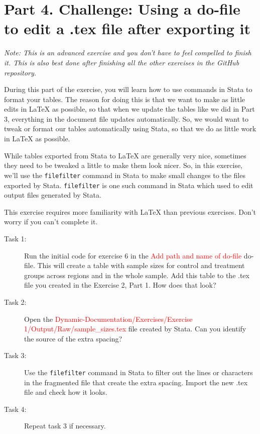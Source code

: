 \documentclass[12pts]{report}
\begin{document}
\section*{Part 4. Challenge: Using a do-file to edit a .tex file after exporting it}
\textit{Note: This is an advanced exercise and you don't have to feel compelled to finish it. This is also best done after finishing all the other exercises in the GitHub repository.}
 
During this part of the exercise, you will learn how to use commands in Stata to format your tables. The reason for doing this is that we want to make as little edits in {\LaTeX} as possible, so that when we update the tables like we did in Part 3, everything in the document file updates automatically. So, we would want to tweak or format our tables automatically using Stata, so that we do as little work in {\LaTeX} as possible.

While tables exported from Stata to {\LaTeX} are generally very nice, sometimes they need to be tweaked a little to make them look nicer. So, in this exercise, we'll use the \texttt{filefilter} command in Stata to make small changes to the files exported by Stata. \texttt{filefilter} is one such command in Stata which used to edit output files generated by Stata.  

This exercise requires more familiarity with {\LaTeX} than previous exercises. Don't worry if you can't complete it. 

\begin{description}
	\item[Task 1:] Run the initial code for exercise 6 in the \textcolor{red}{Add path and name of do-file} do-file. This will create a table with sample sizes for control and treatment groups across regions and in the whole sample. Add this table to the .tex file you created in the Exercise 2, Part 1. How does that look?
	\item[Task 2:] Open the \textcolor{red}{Dynamic-Documentation/Exercises/Exercise 1/Output/Raw/sample\_sizes.tex} file created by Stata. Can you identify the source of the extra spacing?
	\item[Task 3:] Use the \texttt{filefilter} command in Stata to filter out the lines or characters in the fragmented file that create the extra spacing. Import the new .tex file and check how it looks.
	\item[Task 4:] Repeat task 3 if necessary.
\end{description}


\newpage
\end{document}
